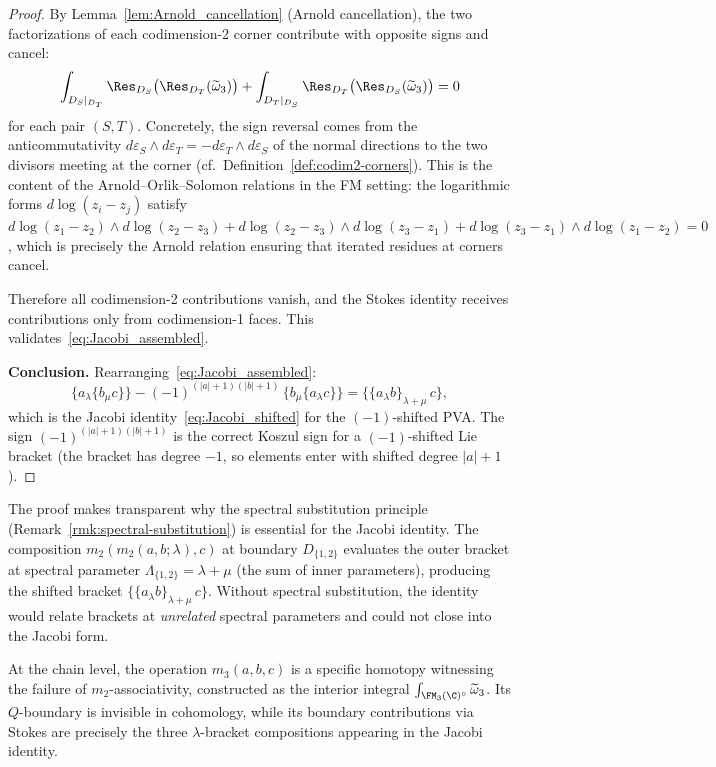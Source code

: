 \begin{proof}
By Lemma~\ref{lem:Arnold_cancellation} (Arnold cancellation), the two factorizations of each codimension-2 corner contribute with opposite signs and cancel:
\[
\int_{D_S|_{D_T}} \Res_{D_S}\bigl(\Res_{D_T}(\widetilde{\omega}_3)\bigr) + \int_{D_T|_{D_S}} \Res_{D_T}\bigl(\Res_{D_S}(\widetilde{\omega}_3)\bigr) = 0
\]
for each pair $(S,T)$. Concretely, the sign reversal comes from the anticommutativity $d\varepsilon_S \wedge d\varepsilon_T = -d\varepsilon_T \wedge d\varepsilon_S$ of the normal directions to the two divisors meeting at the corner (cf.\ Definition~\ref{def:codim2-corners}). This is the content of the Arnold--Orlik--Solomon relations in the FM setting: the logarithmic forms $d\log(z_i - z_j)$ satisfy $d\log(z_1-z_2) \wedge d\log(z_2-z_3) + d\log(z_2-z_3) \wedge d\log(z_3-z_1) + d\log(z_3-z_1) \wedge d\log(z_1-z_2) = 0$, which is precisely the Arnold relation ensuring that iterated residues at corners cancel.

Therefore all codimension-2 contributions vanish, and the Stokes identity receives contributions only from codimension-1 faces. This validates~\eqref{eq:Jacobi_assembled}.

\medskip
\textbf{Conclusion.}
Rearranging~\eqref{eq:Jacobi_assembled}:
\[
\{a_\lambda \{b_\mu c\}\} - (-1)^{(|a|+1)(|b|+1)}\, \{b_\mu \{a_\lambda c\}\} = \{\{a_\lambda b\}_{\lambda+\mu}\, c\},
\]
which is the Jacobi identity~\eqref{eq:Jacobi_shifted} for the $(-1)$-shifted PVA. The sign $(-1)^{(|a|+1)(|b|+1)}$ is the correct Koszul sign for a $(-1)$-shifted Lie bracket (the bracket has degree $-1$, so elements enter with shifted degree $|a|+1$).
\end{proof}

\begin{remark}
The proof makes transparent why the spectral substitution principle (Remark~\ref{rmk:spectral-substitution}) is essential for the Jacobi identity. The composition $m_2(m_2(a,b;\lambda),c)$ at boundary $D_{\{1,2\}}$ evaluates the outer bracket at spectral parameter $\Lambda_{\{1,2\}} = \lambda + \mu$ (the sum of inner parameters), producing the shifted bracket $\{\{a_\lambda b\}_{\lambda+\mu}\, c\}$. Without spectral substitution, the identity would relate brackets at \emph{unrelated} spectral parameters and could not close into the Jacobi form.

At the chain level, the operation $m_3(a,b,c)$ is a specific homotopy
witnessing the failure of $m_2$-associativity, constructed as the
interior integral $\int_{\FM_3(\C)^{\circ}} \widetilde{\omega}_3$.
Its $Q$-boundary is invisible in cohomology, while its boundary
contributions via Stokes are precisely the three $\lambda$-bracket
compositions appearing in the Jacobi identity.
\end{remark}

